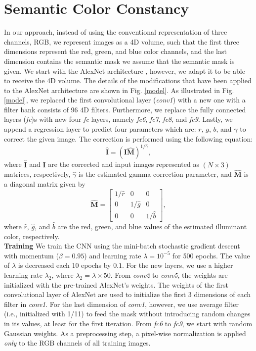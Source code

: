\documentclass[sigplan]{acmart}
\begin{document}
\section{Semantic Color Constancy}
 In our approach, instead of using the conventional representation of three channels, RGB, we represent images as a 4D volume, such that the first three dimensions represent the red, green, and blue color channels, and the last dimension contains the semantic mask \textemdash \space we assume that the semantic mask is given. We start with the AlexNet architecture \cite{alex}, however, we adapt it to be able to receive the 4D volume. The details of the modifications that have been applied to the AlexNet architecture are shown in Fig. \ref{model}. As illustrated in Fig. \ref{model}, we replaced the first convolutional layer (\textit{conv1}) with a new one with a filter bank consists of 96 4D filters. Furthermore, we replace the fully connected layers (\textit{fc})s with new four \textit{fc} layers, namely \textit{fc6}, \textit{fc7}, \textit{fc8}, and \textit{fc9}. Lastly, we append a regression layer to predict four parameters which are: $r$, $g$, $b$, and $\gamma$ to correct the given image. The correction is performed using the following equation: 
\begin{equation}
\hat{\mathbf{I}} = (\mathbf{I}\hat{\mathbf{M}})^{1/\hat{\gamma}},
\end{equation} 
where $\hat{\mathbf{I}}$ and $\mathbf{I}$ are the corrected and input images represented as $(N\times 3)$ matrices, respectively, $\hat{\gamma}$ is the estimated gamma correction parameter, and $\hat{\mathbf{M}}$ is a diagonal matrix given by
\begin{equation}
\hat{\mathbf{M}} = \begin{bmatrix}
1/\hat{r} & 0 & 0\\ 
0 & 1/\hat{g} & 0\\ 
0 & 0 & 1/\hat{b}
\end{bmatrix},
\end{equation}
where $\hat{r}$, $\hat{g}$, and $\hat{b}$ are the red, green, and blue values of the estimated illuminant color, respectively.
\\
\textbf{Training}
We train the CNN using the mini-batch stochastic gradient descent with momentum ($\beta=0.95$) and learning rate $\lambda = 10^{-5}$ for 500 epochs. The value of $\lambda$ is decreased each 10 epochs by $0.1$. For the new layers, we use a higher learning rate $\lambda_2$, where $\lambda_2 = \lambda \times 50$. From \textit{conv2} to \textit{conv5}, the weights are initialized with the pre-trained AlexNet's weights. The weights of the first convolutional layer of AlexNet are used to initialize the first 3 dimensions of each filter in \textit{conv1}. For the last dimension of \textit{conv1}, however, we use average filter (i.e., initialized with 1/11) to feed the mask without introducing random changes in its values, at least for the first iteration. From \textit{fc6} to \textit{fc9}, we start with random Gaussian weights. As a preprocessing step, a pixel-wise normalization is applied \textit{only} to the RGB channels of all training images.
\end{document}

